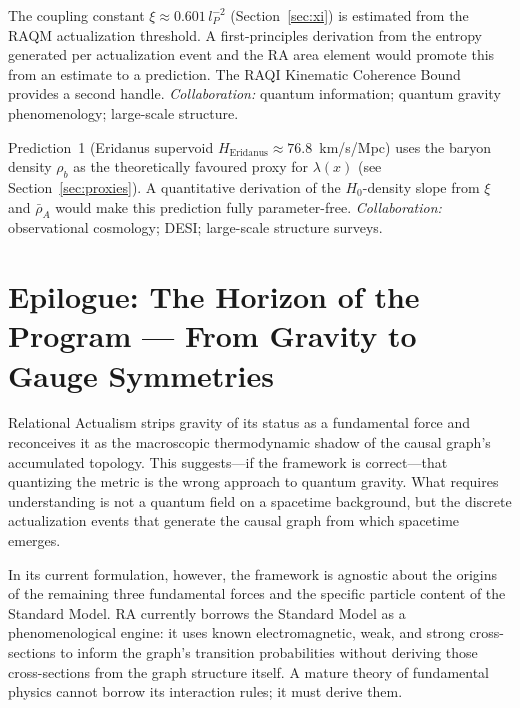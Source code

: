 \documentclass[11pt,a4paper]{article}
\theoremstyle{plain}
\theoremstyle{definition}
\theoremstyle{remark}
\begin{document}
\begin{description}[leftmargin=2em,labelwidth=!,labelsep=0.5em]
\item[\textbf{O5: Fixing $\xi$ from RA microscopic structure.}]
The coupling constant $\xi \approx 0.601\,l_P^{-2}$ (Section~\ref{sec:xi})
is estimated from the RAQM actualization threshold. A first-principles
derivation from the entropy generated per actualization event and the
RA area element would promote this from an estimate to a prediction.
The RAQI Kinematic Coherence Bound provides a second handle.
\textit{Collaboration:} quantum information; quantum gravity phenomenology;
large-scale structure.

\item[\textbf{O6: Quantitative $H_0$-density slope.}]
Prediction~1 (Eridanus supervoid $H_{\mathrm{Eridanus}} \approx 76.8$~km/s/Mpc)
uses the baryon density $\rho_b$ as the theoretically favoured proxy for
$\lambda(x)$ (see Section~\ref{sec:proxies}). A quantitative derivation
of the $H_0$-density slope from $\xi$ and $\bar\rho_A$ would make this
prediction fully parameter-free.
\textit{Collaboration:} observational cosmology; DESI; large-scale structure surveys.

\end{description}

\section*{Epilogue: The Horizon of the Program --- From Gravity to Gauge Symmetries}
\label{sec:epilogue}

Relational Actualism strips gravity of its status as a fundamental force and
reconceives it as the macroscopic thermodynamic shadow of the causal graph's
accumulated topology. This suggests---if the framework is correct---that
quantizing the metric is the wrong approach to quantum gravity. What requires
understanding is not a quantum field on a spacetime background, but the discrete
actualization events that generate the causal graph from which spacetime emerges.

In its current formulation, however, the framework is agnostic about the origins
of the remaining three fundamental forces and the specific particle content of the
Standard Model. RA currently borrows the Standard Model as a phenomenological
engine: it uses known electromagnetic, weak, and strong cross-sections to inform
the graph's transition probabilities without deriving those cross-sections from
the graph structure itself. A mature theory of fundamental physics cannot borrow
its interaction rules; it must derive them.
\end{document}
